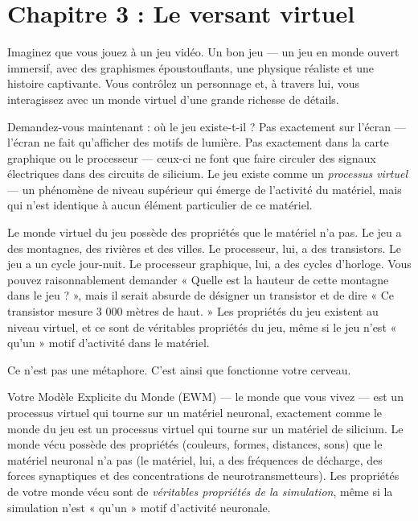 \documentclass[11pt, twoside, openright]{book}
\begin{document}
\chapter*{Chapitre 3 : Le versant virtuel}

Imaginez que vous jouez à un jeu vidéo. Un bon jeu --- un jeu en monde ouvert immersif, avec des graphismes époustouflants, une physique réaliste et une histoire captivante. Vous contrôlez un personnage et, à travers lui, vous interagissez avec un monde virtuel d'une grande richesse de détails.

Demandez-vous maintenant : où le jeu existe-t-il ? Pas exactement sur l'écran --- l'écran ne fait qu'afficher des motifs de lumière. Pas exactement dans la carte graphique ou le processeur --- ceux-ci ne font que faire circuler des signaux électriques dans des circuits de silicium. Le jeu existe comme un \textit{processus virtuel} --- un phénomène de niveau supérieur qui émerge de l'activité du matériel, mais qui n'est identique à aucun élément particulier de ce matériel.

Le monde virtuel du jeu possède des propriétés que le matériel n'a pas. Le jeu a des montagnes, des rivières et des villes. Le processeur, lui, a des transistors. Le jeu a un cycle jour-nuit. Le processeur graphique, lui, a des cycles d'horloge. Vous pouvez raisonnablement demander « Quelle est la hauteur de cette montagne dans le jeu ? », mais il serait absurde de désigner un transistor et de dire « Ce transistor mesure 3 000 mètres de haut. » Les propriétés du jeu existent au niveau virtuel, et ce sont de véritables propriétés du jeu, même si le jeu n'est « qu'un » motif d'activité dans le matériel.

Ce n'est pas une métaphore. C'est ainsi que fonctionne votre cerveau.

Votre Modèle Explicite du Monde (EWM) --- le monde que vous vivez --- est un processus virtuel qui tourne sur un matériel neuronal, exactement comme le monde du jeu est un processus virtuel qui tourne sur un matériel de silicium. Le monde vécu possède des propriétés (couleurs, formes, distances, sons) que le matériel neuronal n'a pas (le matériel, lui, a des fréquences de décharge, des forces synaptiques et des concentrations de neurotransmetteurs). Les propriétés de votre monde vécu sont de \textit{véritables propriétés de la simulation}, même si la simulation n'est « qu'un » motif d'activité neuronale.
\end{document}
